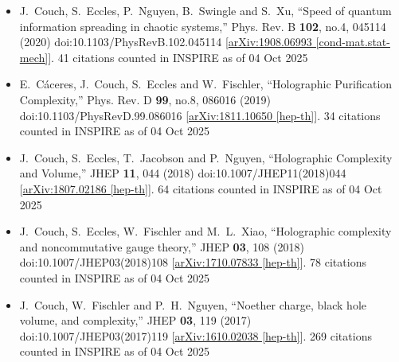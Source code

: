 \begin{itemize}
\item
    J.~Couch, S.~Eccles, P.~Nguyen, B.~Swingle and S.~Xu,
    ``Speed of quantum information spreading in chaotic systems,''
    Phys. Rev. B \textbf{102}, no.4, 045114 (2020)
    doi:10.1103/PhysRevB.102.045114
    [\href{https://arxiv.org/abs/1908.06993}{arXiv:1908.06993 [cond-mat.stat-mech]}].
    41 citations counted in INSPIRE as of 04 Oct 2025

\item 
    E.~C\'aceres, J.~Couch, S.~Eccles and W.~Fischler,
    ``Holographic Purification Complexity,''
    Phys. Rev. D \textbf{99}, no.8, 086016 (2019)
    doi:10.1103/PhysRevD.99.086016
    [\href{https://arxiv.org/abs/1811.10650}{arXiv:1811.10650 [hep-th]}].
    34 citations counted in INSPIRE as of 04 Oct 2025

\item 
    J.~Couch, S.~Eccles, T.~Jacobson and P.~Nguyen,
    ``Holographic Complexity and Volume,''
    JHEP \textbf{11}, 044 (2018)
    doi:10.1007/JHEP11(2018)044
    [\href{https://arxiv.org/abs/1807.02186}{arXiv:1807.02186 [hep-th]}].
    64 citations counted in INSPIRE as of 04 Oct 2025
  
\item
    J.~Couch, S.~Eccles, W.~Fischler and M.~L.~Xiao,
    ``Holographic complexity and noncommutative gauge theory,''
    JHEP \textbf{03}, 108 (2018)
    doi:10.1007/JHEP03(2018)108
    [\href{https://arxiv.org/abs/1710.07833}{arXiv:1710.07833 [hep-th]}].
    78 citations counted in INSPIRE as of 04 Oct 2025

\item  
    J.~Couch, W.~Fischler and P.~H.~Nguyen,
    ``Noether charge, black hole volume, and complexity,''
    JHEP \textbf{03}, 119 (2017)
    doi:10.1007/JHEP03(2017)119
    [\href{https://arxiv.org/abs/1610.02038}{arXiv:1610.02038 [hep-th]}].
    269 citations counted in INSPIRE as of 04 Oct 2025

  
\end{itemize}


